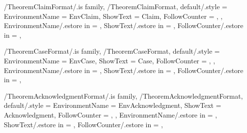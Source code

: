 
\pgfkeys
{
  /TheoremClaimFormat/.is family, /TheoremClaimFormat,
  default/.style =
  {
    EnvironmentName = {EnvClaim},
    ShowText = {Claim},
    FollowCounter = \empty,
  },
  EnvironmentName/.estore in = \GetTheoremClaimFormatEnvironmentName,
  ShowText/.estore in = \GetTheoremClaimFormatShowText,
  FollowCounter/.estore in = \GetTheoremClaimFormatFollowCounter,
} %

\newcommand{\InsertClaim}[1]
{%
  \InsertTheoremContent[\empty]{%
    \GetTheoremClaimFormatEnvironmentName}{#1}%
} %

\newcommand{\InitTheoremClaimFormat}
{%
  \ifthenelse{\equal{\GetTheoremClaimFormatFollowCounter}{\empty}}%
  {%
    \newtheorem*{%
      \GetTheoremClaimFormatEnvironmentName}{%
      \GetTheoremClaimFormatShowText}
  }%
  {%
    \newtheorem{%
      \GetTheoremClaimFormatEnvironmentName}{%
      \GetTheoremClaimFormatShowText}[%
      \GetTheoremClaimFormatFollowCounter]%
  }%
} %


\pgfkeys
{
  /TheoremCaseFormat/.is family, /TheoremCaseFormat,
  default/.style =
  {
    EnvironmentName = {EnvCase},
    ShowText = {Case},
    FollowCounter = \empty,
  },
  EnvironmentName/.estore in = \GetTheoremCaseFormatEnvironmentName,
  ShowText/.estore in = \GetTheoremCaseFormatShowText,
  FollowCounter/.estore in = \GetTheoremCaseFormatFollowCounter,
} %

\newcommand{\InsertCase}[1]
{%
  \InsertTheoremContent[\empty]{%
    \GetTheoremCaseFormatEnvironmentName}{#1}%
} %

\newcommand{\InitTheoremCaseFormat}
{%
  \ifthenelse{\equal{\GetTheoremCaseFormatFollowCounter}{\empty}}%
  {%
    \newtheorem*{%
      \GetTheoremCaseFormatEnvironmentName}{%
      \GetTheoremCaseFormatShowText}
  }%
  {%
    \newtheorem{%
      \GetTheoremCaseFormatEnvironmentName}{%
      \GetTheoremCaseFormatShowText}[%
      \GetTheoremCaseFormatFollowCounter]%
  }%
} %


\pgfkeys
{
  /TheoremAcknowledgmentFormat/.is family, /TheoremAcknowledgmentFormat,
  default/.style =
  {
    EnvironmentName = {EnvAcknowledgment},
    ShowText = {Acknowledgment},
    FollowCounter = \empty,
  },
  EnvironmentName/.estore in = \GetTheoremAcknowledgmentFormatEnvironmentName,
  ShowText/.estore in = \GetTheoremAcknowledgmentFormatShowText,
  FollowCounter/.estore in = \GetTheoremAcknowledgmentFormatFollowCounter,
} %

